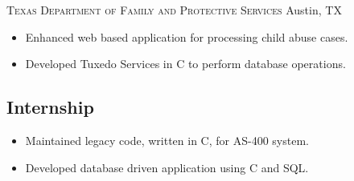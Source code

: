 \documentclass[11pt,letterpaper,sans]{moderncv}
\begin{document}
     {\textsc{Texas Department of Family and Protective Services}}
             {Austin, TX}{}
     {\begin{itemize}
         \item Enhanced web based application for processing child
               abuse cases.
         \item Developed Tuxedo Services in C to perform database
               operations.
     \end{itemize}}

  \subsection{Internship}
     {\begin{itemize}
         \item Maintained legacy code, written in C, for AS-400
               system.
         \item Developed database driven application using C and SQL.
     \end{itemize}}


\end{document}
